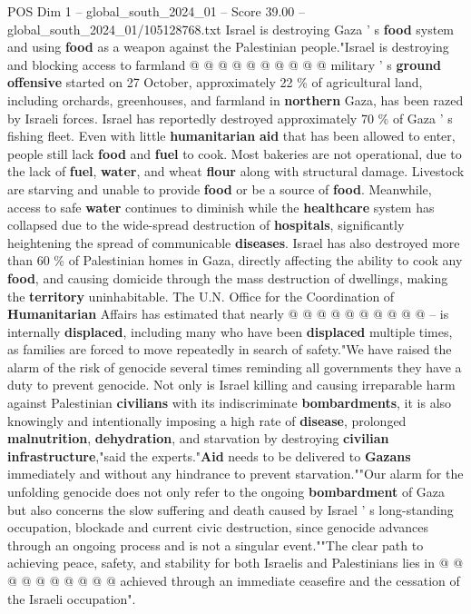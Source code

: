 \begin{textsample}{POS Dim 1 – global\_south\_2024\_01 – Score 39.00 – global\_south\_2024\_01/105128768.txt}
Israel is destroying Gaza ' s \textbf{food} system and using \textbf{food} as a weapon against the Palestinian people."Israel is destroying and blocking access to farmland @ @ @ @ @ @ @ @ @ @ military ' s \textbf{ground} \textbf{offensive} started on 27 October, approximately 22 \% of agricultural land, including orchards, greenhouses, and farmland in \textbf{northern} Gaza, has been razed by Israeli forces.
Israel has reportedly destroyed approximately 70 \% of Gaza ' s fishing fleet.
Even with little \textbf{humanitarian} \textbf{aid} that has been allowed to enter, people still lack \textbf{food} and \textbf{fuel} to cook.
Most bakeries are not operational, due to the lack of \textbf{fuel}, \textbf{water}, and wheat \textbf{flour} along with structural damage.
Livestock are starving and unable to provide \textbf{food} or be a source of \textbf{food}.
Meanwhile, access to safe \textbf{water} continues to diminish while the \textbf{healthcare} system has collapsed due to the wide-spread destruction of \textbf{hospitals}, significantly heightening the spread of communicable \textbf{diseases}.
Israel has also destroyed more than 60 \% of Palestinian homes in Gaza, directly affecting the ability to cook any \textbf{food}, and causing domicide through the mass destruction of dwellings, making the \textbf{territory} uninhabitable.
The U.N.
Office for the Coordination of \textbf{Humanitarian} Affairs has estimated that nearly @ @ @ @ @ @ @ @ @ @ -- is internally \textbf{displaced}, including many who have been \textbf{displaced} multiple times, as families are forced to move repeatedly in search of safety."We have raised the alarm of the risk of genocide several times reminding all governments they have a duty to prevent genocide.
Not only is Israel killing and causing irreparable harm against Palestinian \textbf{civilians} with its indiscriminate \textbf{bombardments}, it is also knowingly and intentionally imposing a high rate of \textbf{disease}, prolonged \textbf{malnutrition}, \textbf{dehydration}, and starvation by destroying \textbf{civilian} \textbf{infrastructure},"said the experts."\textbf{Aid} needs to be delivered to \textbf{Gazans} immediately and without any hindrance to prevent starvation.""Our alarm for the unfolding genocide does not only refer to the ongoing \textbf{bombardment} of Gaza but also concerns the slow suffering and death caused by Israel ' s long-standing occupation, blockade and current civic destruction, since genocide advances through an ongoing process and is not a singular event.""The clear path to achieving peace, safety, and stability for both Israelis and Palestinians lies in @ @ @ @ @ @ @ @ @ @ achieved through an immediate ceasefire and the cessation of the Israeli occupation".

\end{textsample}
